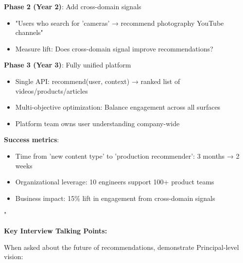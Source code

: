 \documentclass[10pt]{article}
\begin{document}
\textbf{Phase 2 (Year 2)}: Add cross-domain signals
\begin{itemize}
\item "Users who search for 'cameras' → recommend photography YouTube channels"
\item Measure lift: Does cross-domain signal improve recommendations?
\end{itemize}

\textbf{Phase 3 (Year 3)}: Fully unified platform
\begin{itemize}
\item Single API: recommend(user, context) → ranked list of videos/products/articles
\item Multi-objective optimization: Balance engagement across all surfaces
\item Platform team owns user understanding company-wide
\end{itemize}

\textbf{Success metrics}:
\begin{itemize}
\item Time from 'new content type' to 'production recommender': 3 months → 2 weeks
\item Organizational leverage: 10 engineers support 100+ product teams
\item Business impact: 15\% lift in engagement from cross-domain signals
\end{itemize}"

\textbf{Key Interview Talking Points:}

When asked about the future of recommendations, demonstrate Principal-level vision:
\end{document}

